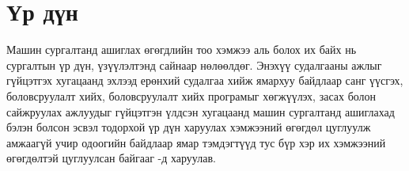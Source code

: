 \chapter{Үр дүн}

Машин сургалтанд ашиглах өгөгдлийн тоо хэмжээ аль болох их байх нь сургалтын үр дүн, үзүүлэлтэнд сайнаар нөлөөлдөг. Энэхүү судалгааны ажлыг гүйцэтгэх хугацаанд эхлээд ерөнхий судалгаа хийж ямархуу байдлаар санг үүсгэх, боловсруулалт хийх, боловсруулалт хийх програмыг хөгжүүлэх, засах болон сайжруулах ажлуудыг гүйцэтгэн үлдсэн хугацаанд машин сургалтанд ашиглахад бэлэн болсон эсвэл тодорхой үр дүн харуулах хэмжээний өгөгдөл цуглуулж амжаагүй учир одоогийн байдлаар ямар тэмдэгтүүд тус бүр хэр их хэмжээний өгөгдөлтэй цуглуулсан байгааг  -д харуулав.

